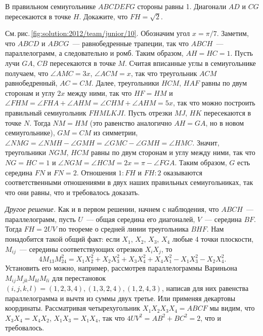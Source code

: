\problem
{}
В правильном семиугольнике $ABCDEFG$ стороны равны 1.
Диагонали $AD$ и $CG$ пересекаются в точке $H$.
Докажите, что $FH = \sqrt{2}$.

%
\label{solution:2012/team/junior/10}%
См.\,рис.\,\ref{fig:solution:2012/team/junior/10}.
Обозначим угол $x = \pi / 7$.
Заметим, что $ABCD$ и $ABCG$~--- равнобедренные трапеции,
так что $ABCH$~--- параллелограмм, а следовательно и ромб.
Таким образом, $AH = HC = 1$.
Пусть лучи $GA$, $CB$ пересекаются в точке $M$.
Считая вписанные углы в семиугольнике получаем,
что $\angle AMC = 3 x$, $\angle ACM = x$,
так что треугольник $ACM$ равнобедренный, $AC = CM$.
Далее, треугольники $HCM$, $HAF$ равны по двум сторонам и
углу $2 x$ между ними, так что $HF = HM$ и
$\angle FHM = \angle FHA + \angle AHM = \angle CHM + \angle AHM = 5 x$,
так что можно построить правильный семиугольник $FHMLKJI$.
Пусть отрезки $MJ$, $HK$ пересекаются в точке $N$.
Тогда $NM = HM$
(это равенство аналогично $AH = GA$, но в новом семиугольнике),
$GM = CM$ из симметрии,
$\angle NMG = \angle NMH - \angle GMH = \angle GMC - \angle GMH = \angle HMC$.
Значит, треугольники $NGM$, $HCM$ равны по двум сторонам и углу между ними,
так что $NG = HC = 1$ и $\angle NGM = \angle HCM = 2 x = \pi - \angle FGA$.
Таким образом, $G$ есть середина $FN$ и $FN = 2$.
Отношения $1 : FH$ и $FH : 2$ оказываются соответственными отношениями в
двух наших правильных семиугольниках, так что они равны, что и требовалось
доказать.
\par
\emph{Другое решение.}
Как и в первом решении, начнем с наблюдения, что $ABCH$~--- параллелограмм,
пусть $U$~--- общая середина его диагоналей, $V$~--- середина $BF$.
Тогда $FH = 2 UV$ по теореме о средней линии треугольника $BHF$.
Нам понадобится такой общий факт:
если $X_1$, $X_2$, $X_3$, $X_4$ любые 4 точки плоскости,
$M_{ij}$~--- середины соответствующих отрезков $X_iX_j$, то
\[
    4 M_{13}M_{24}^2
=
    X_1X_2^2 + X_2X_3^2 + X_3X_4^2 + X_4X_1^2 - X_1X_3^2 - X_2X_4^2
.\] 
Установить его можно, например, рассмотрев параллелограммы Вариньона $M_{ij} M_{jk} M_{kl} M_{li}$ для перестановок
$(i, j, k, l) = (1, 2, 3, 4), (1, 3, 2, 4), (1, 2, 4, 3)$,
написав для них равенства параллелограмма и вычтя из суммы двух третье.
Или применяя декартовы координаты.
Рассматривая четырехугольник $X_1 X_2 X_3 X_4 = ABCF$ мы видим, что
$X_3 X_4 = X_4 X_2$, $X_1 X_3 = X_1 X_4$,
так что $4 UV^2 = AB^2 + BC^2 = 2$, что и требовалось.

\endproblem
